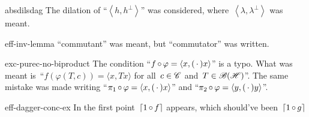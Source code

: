 \begin{erratum}{absdilsdag}%
The dilation of ``$\left<h,h^\perp\right>$''
    was considered,
        where~$\left<\lambda,\lambda^\perp\right>$ was meant.
\end{erratum}
\begin{erratum}{eff-inv-lemma}%
``commutant'' was meant, but ``commutator'' was written.
\end{erratum}
\begin{erratum}{exc-purec-no-biproduct}%
The condition
    ``$f \mathop{\circ} \varphi = \langle x, (\,\cdot\,) x\rangle$''
        is a typo.
        What was meant is~``$f (\varphi(T, c)) = \langle x, T x\rangle $
        for all~$c \in \mathscr{C}$
        and~$T \in \mathscr{B}(\mathscr{H})$''.
The same mistake was made writing
    ``$\pi_1 \mathop{\circ} \varphi = \langle x, (\,\cdot\,) x\rangle$'' and
    ``$\pi_2 \mathop{\circ} \varphi = \langle y, (\,\cdot\,) y\rangle$''.
\end{erratum}
\begin{erratum}{eff-dagger-conc-ex}%
In the first point~$\left\lceil1 \mathop{\circ} f\right\rceil$ appears,
    which should've been~$\left\lceil1 \mathop{\circ} g\right\rceil$
\end{erratum}

